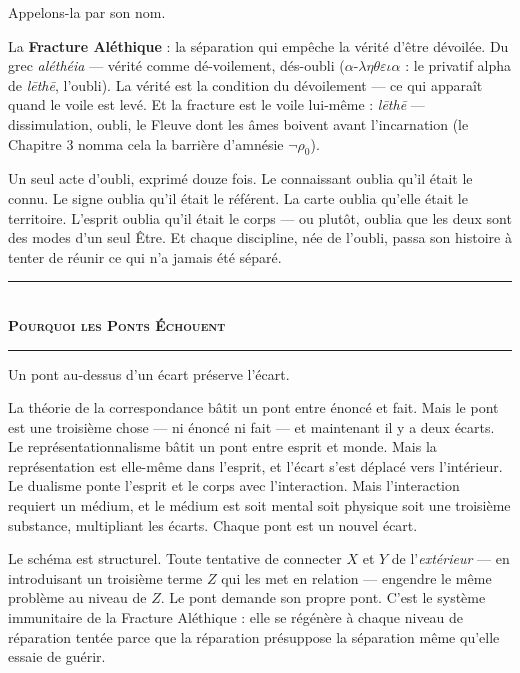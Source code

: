 \documentclass[10pt, openany, oneside]{book}
\renewcommand{\normalsize}{\fontsize{10}{13}\selectfont}
\begin{document}
\noindent Appelons-la par son nom.

La \textbf{Fracture Aléthique} : la séparation qui empêche la vérité d'être dévoilée. Du grec \textit{aléthéia} --- vérité comme dé-voilement, dés-oubli ($\alpha$-$\lambda\eta\theta\varepsilon\iota\alpha$ : le privatif alpha de \textit{l\={e}th\={e}}, l'oubli). La vérité est la condition du dévoilement --- ce qui apparaît quand le voile est levé. Et la fracture est le voile lui-même : \textit{l\={e}th\={e}} --- dissimulation, oubli, le Fleuve dont les âmes boivent avant l'incarnation (le Chapitre 3 nomma cela la barrière d'amnésie $\neg\rho_0$).

Un seul acte d'oubli, exprimé douze fois. Le connaissant oublia qu'il était le connu. Le signe oublia qu'il était le référent. La carte oublia qu'elle était le territoire. L'esprit oublia qu'il était le corps --- ou plutôt, oublia que les deux sont des modes d'un seul Être. Et chaque discipline, née de l'oubli, passa son histoire à tenter de réunir ce qui n'a jamais été séparé.

\vspace{1.5em}


\begin{center}
    \rule{0.3\textwidth}{0.4pt}\\[0.5em]
    {\normalsize\bfseries\scshape Pourquoi les Ponts Échouent}\\[0.3em]
    \rule{0.3\textwidth}{0.4pt}
\end{center}

\vspace{1em}

\noindent Un pont au-dessus d'un écart préserve l'écart.

La théorie de la correspondance bâtit un pont entre énoncé et fait. Mais le pont est une troisième chose --- ni énoncé ni fait --- et maintenant il y a deux écarts. Le représentationnalisme bâtit un pont entre esprit et monde. Mais la représentation est elle-même dans l'esprit, et l'écart s'est déplacé vers l'intérieur. Le dualisme ponte l'esprit et le corps avec l'interaction. Mais l'interaction requiert un médium, et le médium est soit mental soit physique soit une troisième substance, multipliant les écarts. Chaque pont est un nouvel écart.

Le schéma est structurel. Toute tentative de connecter $X$ et $Y$ de l'\textit{extérieur} --- en introduisant un troisième terme $Z$ qui les met en relation --- engendre le même problème au niveau de $Z$. Le pont demande son propre pont. C'est le système immunitaire de la Fracture Aléthique : elle se régénère à chaque niveau de réparation tentée parce que la réparation présuppose la séparation même qu'elle essaie de guérir.
\end{document}
